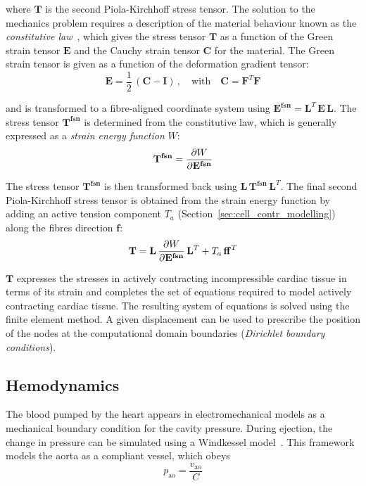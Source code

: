 \noindent
where $\mathbf{T}$ is the second Piola-Kirchhoff stress tensor. The solution to the mechanics problem requires a description of the material behaviour known as the \textit{constitutive law}~\cite{BonetWood:2008}, which gives the stress tensor $\mathbf{T}$ as a function of the Green strain tensor $\mathbf{E}$ and the Cauchy strain tensor $\mathbf{C}$ for the material. The Green strain tensor is given as a function of the deformation gradient tensor:
%
\begin{equation}
    \mathbf{E} = \frac{1}{2}\,(\mathbf{C}-\mathbf{I})\,,\quad\text{with}\quad \mathbf{C}=\mathbf{F}^T\mathbf{F}
\end{equation}

\noindent
and is transformed to a fibre-aligned coordinate system using $\mathbf{E^{fsn}}=\mathbf{L}^T\,\mathbf{E}\,\mathbf{L}$. The stress tensor $\mathbf{T^{fsn}}$ is determined from the constitutive law, which is generally expressed as a \textit{strain energy function} $W$:
%
\begin{equation}
    \mathbf{T^{fsn}} = \dfrac{\partial {W}}{\partial {\mathbf{E^{fsn}}}}
\end{equation}

\noindent
The stress tensor $\mathbf{T^{fsn}}$ is then transformed back using $\mathbf{L}\,\mathbf{T^{fsn}}\,\mathbf{L}^T$. The final second Piola-Kirchhoff stress tensor is obtained from the strain energy function by adding an active tension component $T_a$ (Section~\ref{sec:cell_contr_modelling}) along the fibres direction $\mathbf{f}$:
%
\begin{equation}\label{eq:eqce}
    \mathbf{T} = \mathbf{L}\,\dfrac{\partial {W}}{\partial {\mathbf{E^{fsn}}}}\,\mathbf{L}^T + T_a\,\mathbf{ff}^T
\end{equation}

\noindent
$\mathbf{T}$ expresses the stresses in actively contracting incompressible cardiac tissue in terms of its strain and completes the set of equations required to model actively contracting cardiac tissue. The resulting system of equations is solved using the finite element method. A given displacement can be used to prescribe the position of the nodes at the computational domain boundaries (\textit{Dirichlet boundary conditions}).


%
%
%
\subsection{Hemodynamics}\label{sec:hemodynamics_math_modelling}
The blood pumped by the heart appears in electromechanical models as a mechanical boundary condition for the cavity pressure. During ejection, the change in pressure can be simulated using a Windkessel model~\cite{Westerhof:1971}. This framework models the aorta as a compliant vessel, which obeys
%
\begin{equation}\label{eq:firstwkelem}
    p_{\textrm{ao}} = \frac{v_{\textrm{ao}}}{C}
\end{equation}

